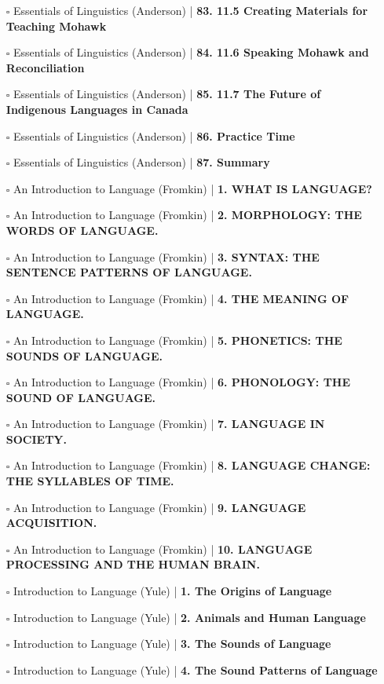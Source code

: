 \documentclass[a4, landscape, 12pt]{article}
\newcommand{\checkbox}{$\square$}%
\begin{document}
\begin{itemize}
{}
\item [\checkbox]  Essentials of Linguistics (Anderson) | \textbf{ 83. 11.5 Creating Materials for Teaching Mohawk
}
\item [\checkbox]  Essentials of Linguistics (Anderson) | \textbf{ 84. 11.6 Speaking Mohawk and Reconciliation
}
\item [\checkbox]  Essentials of Linguistics (Anderson) | \textbf{ 85. 11.7 The Future of Indigenous Languages in Canada
}
\item [\checkbox]  Essentials of Linguistics (Anderson) | \textbf{ 86. Practice Time
}
\item [\checkbox]  Essentials of Linguistics (Anderson) | \textbf{ 87. Summary
}
\item [\checkbox]  An Introduction to Language (Fromkin) | \textbf{ 1. WHAT IS LANGUAGE?
}
\item [\checkbox]  An Introduction to Language (Fromkin) | \textbf{ 2. MORPHOLOGY: THE WORDS OF LANGUAGE.
}
\item [\checkbox]  An Introduction to Language (Fromkin) | \textbf{ 3. SYNTAX: THE SENTENCE PATTERNS OF LANGUAGE.
}
\item [\checkbox]  An Introduction to Language (Fromkin) | \textbf{ 4. THE MEANING OF LANGUAGE.
}
\item [\checkbox]  An Introduction to Language (Fromkin) | \textbf{ 5. PHONETICS: THE SOUNDS OF LANGUAGE.
}
\item [\checkbox]  An Introduction to Language (Fromkin) | \textbf{ 6. PHONOLOGY: THE SOUND OF LANGUAGE.
}
\item [\checkbox]  An Introduction to Language (Fromkin) | \textbf{ 7. LANGUAGE IN SOCIETY.
}
\item [\checkbox]  An Introduction to Language (Fromkin) | \textbf{ 8. LANGUAGE CHANGE: THE SYLLABLES OF TIME.
}
\item [\checkbox]  An Introduction to Language (Fromkin) | \textbf{ 9. LANGUAGE ACQUISITION.
}
\item [\checkbox]  An Introduction to Language (Fromkin) | \textbf{ 10. LANGUAGE PROCESSING AND THE HUMAN BRAIN.
}
\item [\checkbox]  Introduction to Language (Yule) | \textbf{ 1. The Origins of Language
}
\item [\checkbox]  Introduction to Language (Yule) | \textbf{ 2. Animals and Human Language
}
\item [\checkbox]  Introduction to Language (Yule) | \textbf{ 3. The Sounds of Language
}
\item [\checkbox]  Introduction to Language (Yule) | \textbf{ 4. The Sound Patterns of Language
}
\end{itemize}
\end{document}
